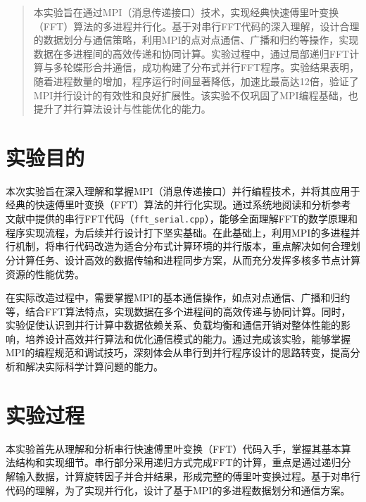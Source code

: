 \documentclass[a4paper, utf8]{ctexart}
\begin{document}
	\maketitle
	
	\renewcommand{\abstractname}{\large \textbf{摘要}}
	\begin{abstract}
		本实验旨在通过MPI（消息传递接口）技术，实现经典快速傅里叶变换（FFT）算法的多进程并行化。基于对串行FFT代码的深入理解，设计合理的数据划分与通信策略，利用MPI的点对点通信、广播和归约等操作，实现数据在多进程间的高效传递和协同计算。实验过程中，通过局部递归FFT计算与多轮蝶形合并通信，成功构建了分布式并行FFT程序。实验结果表明，随着进程数量的增加，程序运行时间显著降低，加速比最高达12倍，验证了MPI并行设计的有效性和良好扩展性。该实验不仅巩固了MPI编程基础，也提升了并行算法设计与性能优化的能力。
		
	\end{abstract}
	
	\section{实验目的}
	
	本次实验旨在深入理解和掌握MPI（消息传递接口）并行编程技术，并将其应用于经典的快速傅里叶变换（FFT）算法的并行化实现。通过系统地阅读和分析参考文献中提供的串行FFT代码（\verb|fft_serial.cpp|），能够全面理解FFT的数学原理和程序实现流程，为后续并行设计打下坚实基础。在此基础上，利用MPI的多进程并行机制，将串行代码改造为适合分布式计算环境的并行版本，重点解决如何合理划分计算任务、设计高效的数据传输和进程同步方案，从而充分发挥多核多节点计算资源的性能优势。
	
	在实际改造过程中，需要掌握MPI的基本通信操作，如点对点通信、广播和归约等，结合FFT算法特点，实现数据在多个进程间的高效传递与协同计算。同时，实验促使认识到并行计算中数据依赖关系、负载均衡和通信开销对整体性能的影响，培养设计高效并行算法和优化通信模式的能力。通过完成该实验，能够掌握MPI的编程规范和调试技巧，深刻体会从串行到并行程序设计的思路转变，提高分析和解决实际科学计算问题的能力。
	
	\section{实验过程}
	
	本实验首先从理解和分析串行快速傅里叶变换（FFT）代码入手，掌握其基本算法结构和实现细节。串行部分采用递归方式完成FFT的计算，重点是通过递归分解输入数据，计算旋转因子并合并结果，形成完整的傅里叶变换过程。基于对串行代码的理解，为了实现并行化，设计了基于MPI的多进程数据划分和通信方案。
	
\end{document}
